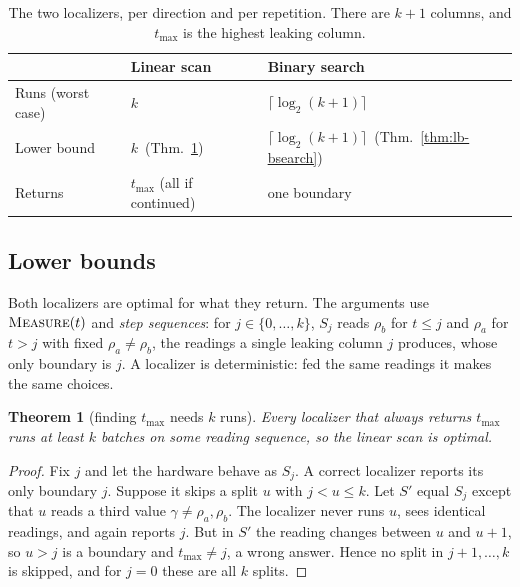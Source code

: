 \documentclass[letterpaper,twocolumn,10pt]{article}
\newtheorem{theorem}{Theorem}
\theoremstyle{definition}
\providecommand{\tmax}{\ensuremath{t_{\max}}}
\newif\ifdraft \draftfalse
\newcommand{\todo}[1]{\ifdraft{\textcolor{red}{[\textbf{TODO:} #1]}}\fi}
\begin{document}
\begin{table}[t]
\centering
\footnotesize
\setlength{\tabcolsep}{4pt}
\caption{The two localizers, per direction and per repetition. There are $k+1$ columns,
and $\tmax$ is the highest leaking column.}
\label{tab:localizers}
\begin{tabular}{@{}lll@{}}
\toprule
 & Linear scan & Binary search \\
\midrule
Runs (worst case) & $k$ & $\lceil\log_2(k{+}1)\rceil$ \\
Lower bound & $k$~(Thm.~\ref{thm:lb-scan}) & $\lceil\log_2(k{+}1)\rceil$~(Thm.~\ref{thm:lb-bsearch}) \\
Returns & $\tmax$ (all if continued) & one boundary \\
\bottomrule
\end{tabular}
\end{table}

\subsection{Lower bounds}
\label{app:lower}
Both localizers are optimal for what they return. The arguments use $\textsc{Measure}(t)$
and \emph{step sequences}: for $j\in\{0,\dots,k\}$, $S_j$ reads $\rho_b$ for $t\le j$ and
$\rho_a$ for $t>j$ with fixed $\rho_a\neq\rho_b$, the readings a single leaking column $j$
produces, whose only boundary is $j$. A localizer is deterministic: fed the same readings
it makes the same choices.

\begin{theorem}[finding $\tmax$ needs $k$ runs]
\label{thm:lb-scan}
Every localizer that always returns $\tmax$ runs at least $k$ batches on some reading
sequence, so the linear scan is optimal.
\end{theorem}
\begin{proof}
\todo{should this be removed? moved to appendix? only explained?}
Fix $j$ and let the hardware behave as $S_j$. A correct localizer reports its only
boundary $j$. Suppose it skips a split $u$ with $j<u\le k$. Let $S'$ equal $S_j$ except
that $u$ reads a third value $\gamma\neq\rho_a,\rho_b$. The localizer never runs $u$, sees
identical readings, and again reports $j$. But in $S'$ the reading changes between $u$ and
$u+1$, so $u>j$ is a boundary and $\tmax\neq j$, a wrong answer. Hence no split in
$j{+}1,\dots,k$ is skipped, and for $j=0$ these are all $k$ splits.
\end{proof}
\end{document}

